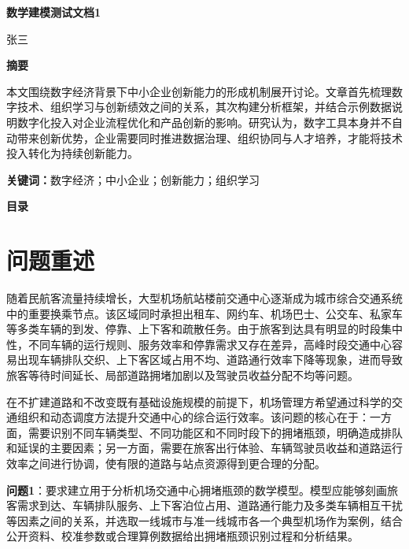 \documentclass[UTF8,a4paper,11pt,onecolumn,fontset=none]{ctexart}
\makeatletter
\newcommand{\customtableofcontents}{%
  \begin{center}
    {\fontsize{12pt}{14.4pt}\selectfont\bfseries 目录}
  \end{center}
  \vspace{1em}
  \@starttoc{toc}
}
\newcommand{\PaperTitle}{数学建模测试文档1}
\newcommand{\PaperAuthor}{张三}
\newcommand{\PaperAbstract}{本文围绕数字经济背景下中小企业创新能力的形成机制展开讨论。文章首先梳理数字技术、组织学习与创新绩效之间的关系，其次构建分析框架，并结合示例数据说明数字化投入对企业流程优化和产品创新的影响。研究认为，数字工具本身并不自动带来创新优势，企业需要同时推进数据治理、组织协同与人才培养，才能将技术投入转化为持续创新能力。}
\newcommand{\PaperKeywords}{数字经济；中小企业；创新能力；组织学习}
\makeatother
\begin{document}
\pagestyle{frontmatter}
\begin{titlepage}
  \thispagestyle{frontmatter}
  \centering
  \vspace*{2.5cm}
  {\bfseries \PaperTitle\par}
  \vspace{1.5cm}
  { \PaperAuthor\par}
  \vspace{2cm}

  {\bfseries 摘\quad 要\par}
  \vspace{1em}
  \begin{minipage}{0.88\textwidth}
    \PaperAbstract

    \vspace{1em}
    \noindent\textbf{关键词：}\PaperKeywords
  \end{minipage}
  \vfill
\end{titlepage}

\clearpage
\thispagestyle{frontmatter}
\customtableofcontents
\thispagestyle{frontmatter}

\clearpage
{}
\setcounter{page}{1}
\pagestyle{plain}

\section{问题重述}
\label{sec1}
随着民航客流量持续增长，大型机场航站楼前交通中心逐渐成为城市综合交通系统中的重要换乘节点。该区域同时承担出租车、网约车、机场巴士、公交车、私家车等多类车辆的到发、停靠、上下客和疏散任务。由于旅客到达具有明显的时段集中性，不同车辆的运行规则、服务效率和停靠需求又存在差异，高峰时段交通中心容易出现车辆排队交织、上下客区域占用不均、道路通行效率下降等现象，进而导致旅客等待时间延长、局部道路拥堵加剧以及驾驶员收益分配不均等问题。

在不扩建道路和不改变既有基础设施规模的前提下，机场管理方希望通过科学的交通组织和动态调度方法提升交通中心的综合运行效率。该问题的核心在于：一方面，需要识别不同车辆类型、不同功能区和不同时段下的拥堵瓶颈，明确造成排队和延误的主要因素；另一方面，需要在旅客出行体验、车辆驾驶员收益和道路运行效率之间进行协调，使有限的道路与站点资源得到更合理的分配。

\textbf{问题1}：要求建立用于分析机场交通中心拥堵瓶颈的数学模型。模型应能够刻画旅客需求到达、车辆排队服务、上下客泊位占用、道路通行能力及多类车辆相互干扰等因素之间的关系，并选取一线城市与准一线城市各一个典型机场作为案例，结合公开资料、校准参数或合理算例数据给出拥堵瓶颈识别过程和分析结果。
\end{document}
